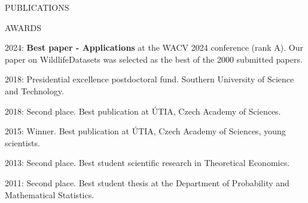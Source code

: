 \documentclass[11pt, aspectratio=169]{beamer}
\newenvironment{wideitemize}{\itemize\addtolength{\itemsep}{10pt}}{\enditemize}
\begin{document}
\begin{frame}{PUBLICATIONS}
\begin{minipage}[t]{0.53\textwidth}
\begin{wideitemize}
\end{wideitemize}
\end{minipage}
\hfill
\begin{minipage}[t]{0.45\textwidth}
\end{minipage}
\end{frame}


\begin{frame}{AWARDS}
\begin{wideitemize}
\item 2024: \textbf{Best paper - Applications} at the WACV 2024 conference (rank A). Our paper on WildlifeDatasets was selected as the best of the 2000 submitted papers.
\pause \item 2018: Presidential excellence postdoctoral fund. Southern University of Science and Technology.
\item 2018: Second place. Best publication at \'UTIA, Czech Academy of Sciences.
\item 2015: Winner. Best publication at \'UTIA, Czech Academy of Sciences, young scientists.
\item 2013: Second place. Best student scientific research in Theoretical Economics.
\item 2011: Second place. Best student thesis at the Department of Probability and Mathematical Statistics.
\end{wideitemize}
\end{frame}
\end{document}
